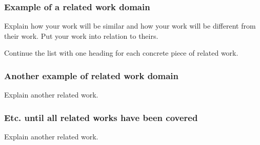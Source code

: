 \subsubsection{Example of a related work domain}
Explain how your work will be similar and how your work will be different from their work. Put your work into relation to theirs.

Continue the list with one heading for each concrete piece of related work.

\subsubsection{Another example of related work domain}
Explain another related work.

\subsubsection{Etc. until all related works have been covered}
Explain another related work.

